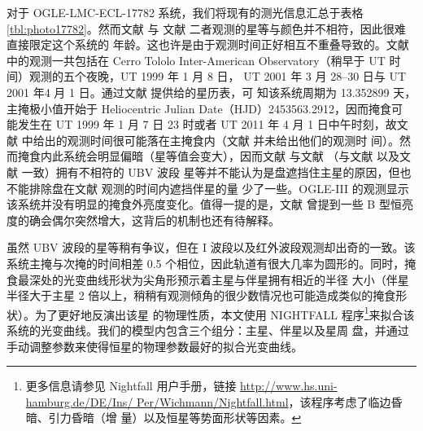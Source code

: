 对于 OGLE-LMC-ECL-17782 系统，我们将现有的测光信息汇总于表格 \ref{tbl:photo17782}。然而文献 
 与 文献  二者观测的星等与颜色并不相符，因此很难直接限定这个系统的
年龄。这也许是由于观测时间正好相互不重叠导致的。文献  中的观测一共包括在 Cerro Tololo 
Inter-American Observatory（稍早于 \textsc{UT} 时间）观测的五个夜晚，\textsc{UT} 1999 年 1 月 8 日，
\textsc{UT} 2001 年 3 月 28--30 日与 UT 2001 年4 月 1 日。通过文献  提供给的星历表，可
知该系统周期为 13.352899 天，主掩极小值开始于 Heliocentric Julian Date（HJD）2453563.2912，因而掩食可
能发生在  \textsc{UT} 1999 年 1 月 7 日 23 时或者 \textsc{UT} 2011 年 4 月 1 日中午时刻，故文献 
  中给出的观测时间很可能落在主掩食内（文献  并未给出他们的观测时
间）。然而掩食内此系统会明显偏暗（星等值会变大），因而文献  与文献 
 （与文献  以及文献  一致）拥有不相符的 UBV 波段
星等并不能认为是盘遮挡住主星的原因，但也不能排除盘在文献  观测的时间内遮挡伴星的量
少了一些。OGLE-III 的观测显示该系统并没有明显的掩食外亮度变化。值得一提的是，文献  
曾提到一些 B 型恒亮度的确会偶尔突然增大，这背后的机制也还有待解释。


虽然 UBV 波段的星等稍有争议，但在 I 波段以及红外波段观测却出奇的一致。该系统主掩与次掩的时间相差 
0.5 个相位，因此轨道有很大几率为圆形的。同时，掩食最深处的光变曲线形状为尖角形预示着主星与伴星拥有相近的半径
大小（伴星半径大于主星 2 倍以上，稍稍有观测倾角的很少数情况也可能造成类似的掩食形状）。为了更好地反演出该星
的物理性质，本文使用 \textsc{NIGHTFALL} 程序\footnote{更多信息请参见 Nightfall 用户手册\cite{Wichmann2011}，链接
\url{http://www.hs.uni-hamburg.de/DE/Ins/ Per/Wichmann/Nightfall.html}，该程序考虑了临边昏暗、引力昏暗（增
量）以及恒星等势面形状等因素。}来拟合该系统的光变曲线。我们的模型内包含三个组分：主星、伴星以及星周
盘，并通过手动调整参数来使得恒星的物理参数最好的拟合光变曲线。


